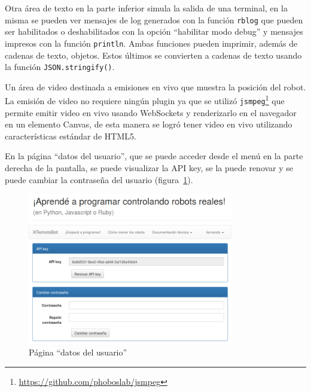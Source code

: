 Otra área de texto en la parte inferior
simula la salida de una terminal, en la misma
se pueden ver mensajes de log generados con la función
\texttt{rblog} que pueden ser habilitados o deshabilitados con la opción
``habilitar modo debug''
 y mensajes impresos con la función \texttt{println}.
Ambas funciones pueden imprimir, además de cadenas de texto, objetos. Estos últimos
se convierten a cadenas de texto usando la función \texttt{JSON.stringify()}.

Un área de video destinada a emisiones en vivo que muestra la posición
del robot. La emisión de video no requiere ningún plugin ya que se utilizó
\texttt{jsmpeg}\footnote{\url{https://github.com/phoboslab/jsmpeg}}
que permite emitir video en vivo usando WebSockets y renderizarlo
en el navegador en un elemento Canvas, de esta manera se logró tener
video en vivo utilizando características estándar de HTML5.

En la página ``datos del usuario'', que se puede acceder desde el
menú en la parte derecha de la pantalla, se puede visualizar la
API key, se la puede renovar y se puede cambiar la contraseña del usuario
(figura~\ref{fig:user_data}).

\begin{figure}
    \centering
    \includegraphics[width=0.8\textwidth]{figures/user_data}
    \caption{Página ``datos del usuario''}
    \label{fig:user_data}
\end{figure}
